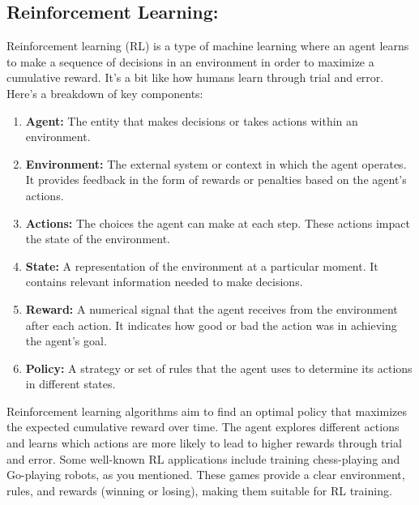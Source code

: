 \documentclass[12pt,a4paper,twoside]{article}
\begin{document}
	\subsection{Reinforcement Learning:}
	Reinforcement learning (RL) is a type of machine learning where an agent learns to make a sequence of decisions in an environment in order to maximize a cumulative reward. It's a bit like how humans learn through trial and error. Here's a breakdown of key components:
	\begin{enumerate}
		\item \textbf{Agent:} The entity that makes decisions or takes actions within an environment.
		
		\item \textbf{Environment:} The external system or context in which the agent operates. It provides feedback in the form of rewards or penalties based on the agent's actions.
		
		\item \textbf{Actions:} The choices the agent can make at each step. These actions impact the state of the environment.
		
		\item \textbf{State:} A representation of the environment at a particular moment. It contains relevant information needed to make decisions.
		
		\item \textbf{Reward:} A numerical signal that the agent receives from the environment after each action. It indicates how good or bad the action was in achieving the agent's goal.
		
		\item \textbf{Policy:} A strategy or set of rules that the agent uses to determine its actions in different states.
	\end{enumerate}
	Reinforcement learning algorithms aim to find an optimal policy that maximizes the expected cumulative reward over time. The agent explores different actions and learns which actions are more likely to lead to higher rewards through trial and error. Some well-known RL applications include training chess-playing and Go-playing robots, as you mentioned. These games provide a clear environment, rules, and rewards (winning or losing), making them suitable for RL training.
\end{document}
